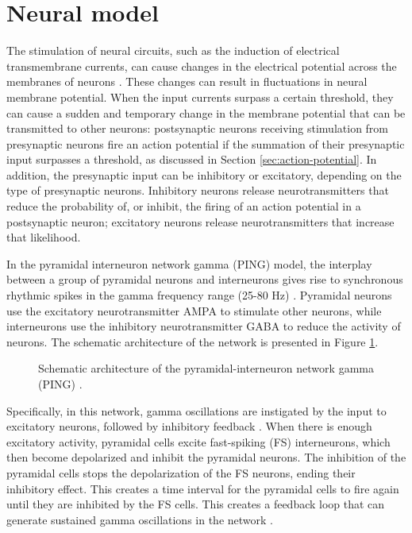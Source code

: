 \section{Neural model}
\label{sec:grid-ping}

The stimulation of neural circuits, such as the induction of electrical transmembrane currents, can cause changes in the electrical potential across the membranes of neurons \cite{IzhikevichBook2004:2}. These changes can result in fluctuations in neural membrane potential. 
When the input currents surpass a certain threshold, they can cause a sudden and temporary change in the membrane potential that can be transmitted to other neurons: postsynaptic neurons receiving stimulation from presynaptic neurons fire an action potential if the summation of their presynaptic input surpasses a threshold, as discussed in Section \ref{sec:action-potential}. In addition, the presynaptic input can be inhibitory or excitatory, depending on the type of presynaptic neurons. Inhibitory neurons release neurotransmitters that reduce the probability of, or inhibit, the firing of an action potential in a postsynaptic neuron; excitatory neurons release neurotransmitters that increase that likelihood. 

In the pyramidal interneuron network gamma (PING) model, the interplay between a group of pyramidal neurons and interneurons gives rise to synchronous rhythmic spikes in the gamma frequency range (25-80 Hz)  \cite{Whittington2000, Borgers2003}. Pyramidal neurons use the excitatory neurotransmitter AMPA to stimulate other neurons, while interneurons use the inhibitory neurotransmitter GABA to reduce the activity of neurons. The schematic architecture of the network is presented in Figure \ref{fig:single-ping}.

\begin{figure}[!htp]
    \centering
    
    \caption[Schematic architecture of PING]{Schematic architecture of the pyramidal-interneuron network gamma (PING) \cite{Lowet2015}.}
    \label{fig:single-ping}
\end{figure}

Specifically, in this network, gamma oscillations are instigated by the input to excitatory neurons, followed by inhibitory feedback \cite{Whittington2000}. When there is enough excitatory activity, pyramidal cells excite fast-spiking (FS) interneurons, which then become depolarized and inhibit the pyramidal neurons. The inhibition of the pyramidal cells stops the depolarization of the FS neurons, ending their inhibitory effect.
This creates a time interval for the pyramidal cells to fire again until they are inhibited by the FS cells. This creates a feedback loop that can generate sustained gamma oscillations in the network \cite{Kopell2011}.

